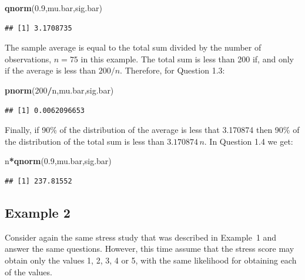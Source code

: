 \documentclass[]{krantz}
\makeatletter
\newenvironment{Shaded}{\begin{snugshade}}{\end{snugshade}}
\newcommand{\DecValTok}[1]{\textcolor[rgb]{0.00,0.00,0.81}{#1}}
\newcommand{\FloatTok}[1]{\textcolor[rgb]{0.00,0.00,0.81}{#1}}
\newcommand{\KeywordTok}[1]{\textcolor[rgb]{0.13,0.29,0.53}{\textbf{#1}}}
\newcommand{\NormalTok}[1]{#1}
\newcommand{\OperatorTok}[1]{\textcolor[rgb]{0.81,0.36,0.00}{\textbf{#1}}}
\newenvironment{kframe}{%
\medskip{}
\setlength{\fboxsep}{.8em}
 \def\at@end@of@kframe{}%
 \ifinner\ifhmode%
  \def\at@end@of@kframe{\end{minipage}}%
  \begin{minipage}{\columnwidth}%
 \fi\fi%
 \def\FrameCommand##1{\hskip\@totalleftmargin \hskip-\fboxsep
 \colorbox{shadecolor}{##1}\hskip-\fboxsep
     \hskip-\linewidth \hskip-\@totalleftmargin \hskip\columnwidth}%
 \MakeFramed {\advance\hsize-\width
   \@totalleftmargin\z@ \linewidth\hsize
   \@setminipage}}%
 {\par\unskip\endMakeFramed%
 \at@end@of@kframe}
\renewenvironment{Shaded}{\begin{kframe}}{\end{kframe}}
\theoremstyle{definition}
\theoremstyle{definition}
\theoremstyle{definition}
\theoremstyle{remark}
\makeatother
\begin{document}
\begin{Shaded}
\begin{Highlighting}[]
\KeywordTok{qnorm}\NormalTok{(}\FloatTok{0.9}\NormalTok{,mu.bar,sig.bar)}
\end{Highlighting}
\end{Shaded}

\begin{verbatim}
## [1] 3.1708735
\end{verbatim}

The sample average is equal to the total sum divided by the number of
observations, \(n=75\) in this example. The total sum is less than 200 if,
and only if the average is less than \(200/n\). Therefore, for Question
1.3:

\begin{Shaded}
\begin{Highlighting}[]
\KeywordTok{pnorm}\NormalTok{(}\DecValTok{200}\OperatorTok{/}\NormalTok{n,mu.bar,sig.bar)}
\end{Highlighting}
\end{Shaded}

\begin{verbatim}
## [1] 0.0062096653
\end{verbatim}

Finally, if 90\% of the distribution of the average is less that 3.170874
then 90\% of the distribution of the total sum is less than
\(3.170874\, n\). In Question 1.4 we get:

\begin{Shaded}
\begin{Highlighting}[]
\NormalTok{n}\OperatorTok{*}\KeywordTok{qnorm}\NormalTok{(}\FloatTok{0.9}\NormalTok{,mu.bar,sig.bar)}
\end{Highlighting}
\end{Shaded}

\begin{verbatim}
## [1] 237.81552
\end{verbatim}

\hypertarget{example-2}{%
\subsection{Example 2}\label{example-2}}

Consider again the same stress study that was described in Example~1 and
answer the same questions. However, this time assume that the stress
score may obtain only the values 1, 2, 3, 4 or 5, with the same
likelihood for obtaining each of the values.
\end{document}
